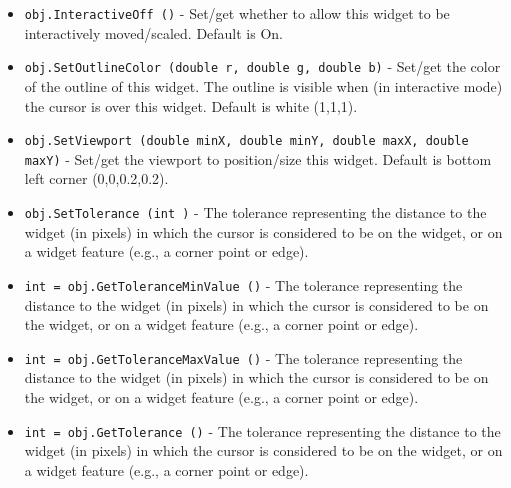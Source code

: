 \begin{itemize}
\item  \verb|obj.InteractiveOff ()| -  Set/get whether to allow this widget to be interactively moved/scaled.
 Default is On.

\item  \verb|obj.SetOutlineColor (double r, double g, double b)| -  Set/get the color of the outline of this widget.  The outline is visible
 when (in interactive mode) the cursor is over this widget.
 Default is white (1,1,1).

\item  \verb|obj.SetViewport (double minX, double minY, double maxX, double maxY)| -  Set/get the viewport to position/size this widget.
 Default is bottom left corner (0,0,0.2,0.2).

\item  \verb|obj.SetTolerance (int )| -  The tolerance representing the distance to the widget (in pixels)
 in which the cursor is considered to be on the widget, or on a
 widget feature (e.g., a corner point or edge).

\item  \verb|int = obj.GetToleranceMinValue ()| -  The tolerance representing the distance to the widget (in pixels)
 in which the cursor is considered to be on the widget, or on a
 widget feature (e.g., a corner point or edge).

\item  \verb|int = obj.GetToleranceMaxValue ()| -  The tolerance representing the distance to the widget (in pixels)
 in which the cursor is considered to be on the widget, or on a
 widget feature (e.g., a corner point or edge).

\item  \verb|int = obj.GetTolerance ()| -  The tolerance representing the distance to the widget (in pixels)
 in which the cursor is considered to be on the widget, or on a
 widget feature (e.g., a corner point or edge).

\end{itemize}
